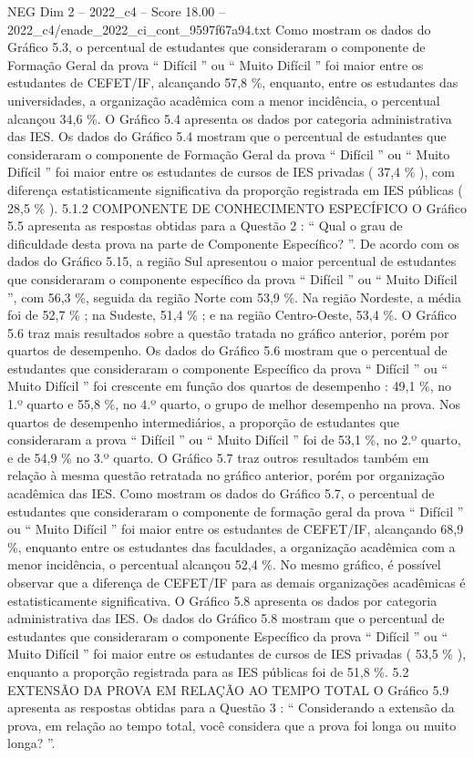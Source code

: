 \begin{textsample}{NEG Dim 2 – 2022\_c4 – Score 18.00 – 2022\_c4/enade\_2022\_ci\_cont\_9597f67a94.txt}
Como mostram os dados do Gráfico 5.3, o percentual de estudantes que consideraram o componente de Formação Geral da prova “ Difícil ” ou “ Muito Difícil ” foi maior entre os estudantes de CEFET/IF, alcançando 57,8 \%, enquanto, entre os estudantes das universidades, a organização acadêmica com a menor incidência, o percentual alcançou 34,6 \%.
O Gráfico 5.4 apresenta os dados por categoria administrativa das IES.
Os dados do Gráfico 5.4 mostram que o percentual de estudantes que consideraram o componente de Formação Geral da prova “ Difícil ” ou “ Muito Difícil ” foi maior entre os estudantes de cursos de IES privadas ( 37,4 \% ), com diferença estatisticamente significativa da proporção registrada em IES públicas ( 28,5 \% ). 5.1.2 COMPONENTE DE CONHECIMENTO ESPECÍFICO O Gráfico 5.5 apresenta as respostas obtidas para a Questão 2 : “ Qual o grau de dificuldade desta prova na parte de Componente Específico? ”.
De acordo com os dados do Gráfico 5.15, a região Sul apresentou o maior percentual de estudantes que consideraram o componente específico da prova “ Difícil ” ou “ Muito Difícil ”, com 56,3 \%, seguida da região Norte com 53,9 \%.
Na região Nordeste, a média foi de 52,7 \% ; na Sudeste, 51,4 \% ; e na região Centro-Oeste, 53,4 \%.
O Gráfico 5.6 traz mais resultados sobre a questão tratada no gráfico anterior, porém por quartos de desempenho.
Os dados do Gráfico 5.6 mostram que o percentual de estudantes que consideraram o componente Específico da prova “ Difícil ” ou “ Muito Difícil ” foi crescente em função dos quartos de desempenho : 49,1 \%, no 1.º quarto e 55,8 \%, no 4.º quarto, o grupo de melhor desempenho na prova.
Nos quartos de desempenho intermediários, a proporção de estudantes que consideraram a prova “ Difícil ” ou “ Muito Difícil ” foi de 53,1 \%, no 2.º quarto, e de 54,9 \% no 3.º quarto.
O Gráfico 5.7 traz outros resultados também em relação à mesma questão retratada no gráfico anterior, porém por organização acadêmica das IES.
Como mostram os dados do Gráfico 5.7, o percentual de estudantes que consideraram o componente de formação geral da prova “ Difícil ” ou “ Muito Difícil ” foi maior entre os estudantes de CEFET/IF, alcançando 68,9 \%, enquanto entre os estudantes das faculdades, a organização acadêmica com a menor incidência, o percentual alcançou 52,4 \%.
No mesmo gráfico, é possível observar que a diferença de CEFET/IF para as demais organizações acadêmicas é estatisticamente significativa.
O Gráfico 5.8 apresenta os dados por categoria administrativa das IES.
Os dados do Gráfico 5.8 mostram que o percentual de estudantes que consideraram o componente Específico da prova “ Difícil ” ou “ Muito Difícil ” foi maior entre os estudantes de cursos de IES privadas ( 53,5 \% ), enquanto a proporção registrada para as IES públicas foi de 51,8 \%. 5.2 EXTENSÃO DA PROVA EM RELAÇÃO AO TEMPO TOTAL O Gráfico 5.9 apresenta as respostas obtidas para a Questão 3 : “ Considerando a extensão da prova, em relação ao tempo total, você considera que a prova foi longa ou muito longa? ”.

\end{textsample}
